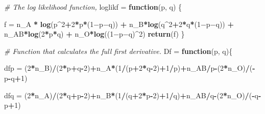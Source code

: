 \documentclass[]{article}
\newenvironment{Shaded}{\begin{snugshade}}{\end{snugshade}}
\newcommand{\KeywordTok}[1]{\textcolor[rgb]{0.13,0.29,0.53}{\textbf{#1}}}
\newcommand{\DecValTok}[1]{\textcolor[rgb]{0.00,0.00,0.81}{#1}}
\newcommand{\StringTok}[1]{\textcolor[rgb]{0.31,0.60,0.02}{#1}}
\newcommand{\CommentTok}[1]{\textcolor[rgb]{0.56,0.35,0.01}{\textit{#1}}}
\newcommand{\ControlFlowTok}[1]{\textcolor[rgb]{0.13,0.29,0.53}{\textbf{#1}}}
\newcommand{\OperatorTok}[1]{\textcolor[rgb]{0.81,0.36,0.00}{\textbf{#1}}}
\newcommand{\NormalTok}[1]{#1}
\begin{document}
\begin{Shaded}
\begin{Highlighting}[]
\CommentTok{# The log likelihood function,}
\NormalTok{loglikf =}\StringTok{ }\ControlFlowTok{function}\NormalTok{(p, q) \{}

\NormalTok{  f =}\StringTok{ }\NormalTok{n_A }\OperatorTok{*}\StringTok{ }\KeywordTok{log}\NormalTok{(p}\OperatorTok{^}\DecValTok{2}\OperatorTok{+}\DecValTok{2}\OperatorTok{*}\NormalTok{p}\OperatorTok{*}\NormalTok{(}\DecValTok{1}\NormalTok{−p−q)) }\OperatorTok{+}\StringTok{ }\NormalTok{n_B}\OperatorTok{*}\KeywordTok{log}\NormalTok{(q}\OperatorTok{^}\DecValTok{2}\OperatorTok{+}\DecValTok{2}\OperatorTok{*}\NormalTok{q}\OperatorTok{*}\NormalTok{(}\DecValTok{1}\NormalTok{−p−q)) }\OperatorTok{+}\StringTok{ }\NormalTok{n_AB}\OperatorTok{*}\KeywordTok{log}\NormalTok{(}\DecValTok{2}\OperatorTok{*}\NormalTok{p}\OperatorTok{*}\NormalTok{q) }\OperatorTok{+}\StringTok{ }\NormalTok{n_O}\OperatorTok{*}\KeywordTok{log}\NormalTok{((}\DecValTok{1}\NormalTok{−p−q)}\OperatorTok{^}\DecValTok{2}\NormalTok{)}
  \KeywordTok{return}\NormalTok{(f)}
\NormalTok{\}}

\CommentTok{# Function that calculates the full first derivative. }
\NormalTok{Df =}\StringTok{ }\ControlFlowTok{function}\NormalTok{(p, q)\{}
  
\NormalTok{  dfp =}\StringTok{ }\NormalTok{(}\DecValTok{2}\OperatorTok{*}\NormalTok{n_B)}\OperatorTok{/}\NormalTok{(}\DecValTok{2}\OperatorTok{*}\NormalTok{p}\OperatorTok{+}\NormalTok{q}\OperatorTok{-}\DecValTok{2}\NormalTok{)}\OperatorTok{+}\NormalTok{n_A}\OperatorTok{*}\NormalTok{(}\DecValTok{1}\OperatorTok{/}\NormalTok{(p}\OperatorTok{+}\DecValTok{2}\OperatorTok{*}\NormalTok{q}\OperatorTok{-}\DecValTok{2}\NormalTok{)}\OperatorTok{+}\DecValTok{1}\OperatorTok{/}\NormalTok{p)}\OperatorTok{+}\NormalTok{n_AB}\OperatorTok{/}\NormalTok{p}\OperatorTok{-}\NormalTok{(}\DecValTok{2}\OperatorTok{*}\NormalTok{n_O)}\OperatorTok{/}\NormalTok{(}\OperatorTok{-}\NormalTok{p}\OperatorTok{-}\NormalTok{q}\OperatorTok{+}\DecValTok{1}\NormalTok{)}
  
\NormalTok{  dfq =}\StringTok{ }\NormalTok{(}\DecValTok{2}\OperatorTok{*}\NormalTok{n_A)}\OperatorTok{/}\NormalTok{(}\DecValTok{2}\OperatorTok{*}\NormalTok{q}\OperatorTok{+}\NormalTok{p}\OperatorTok{-}\DecValTok{2}\NormalTok{)}\OperatorTok{+}\NormalTok{n_B}\OperatorTok{*}\NormalTok{(}\DecValTok{1}\OperatorTok{/}\NormalTok{(q}\OperatorTok{+}\DecValTok{2}\OperatorTok{*}\NormalTok{p}\OperatorTok{-}\DecValTok{2}\NormalTok{)}\OperatorTok{+}\DecValTok{1}\OperatorTok{/}\NormalTok{q)}\OperatorTok{+}\NormalTok{n_AB}\OperatorTok{/}\NormalTok{q}\OperatorTok{-}\NormalTok{(}\DecValTok{2}\OperatorTok{*}\NormalTok{n_O)}\OperatorTok{/}\NormalTok{(}\OperatorTok{-}\NormalTok{q}\OperatorTok{-}\NormalTok{p}\OperatorTok{+}\DecValTok{1}\NormalTok{)}
  

\end{Highlighting}
\end{Shaded}
\end{document}
